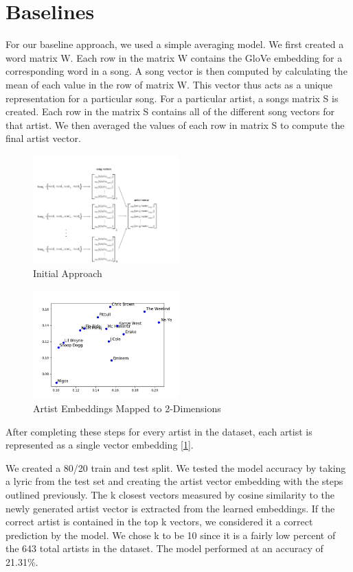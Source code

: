 \documentclass[11pt,a4paper]{article}
\begin{document}
    \section{Baselines}
For our baseline approach, we used a simple averaging model. We first created a word matrix W. Each row in the matrix W contains the GloVe embedding  for a corresponding word in a song. 
A song vector is then computed by calculating the mean of each value in the row of matrix W. 
This vector thus acts as a unique representation for a particular song. 
For a particular artist, a songs matrix S is created. Each row in the matrix S contains all of the different song vectors for that artist. 
We then averaged the values of each row in matrix S to compute the final artist vector. 

\begin{figure}[t]
    \centering
    \includegraphics[width=0.5\textwidth]{figs/naive_model.png}
    \caption{Initial Approach}
    \label{fig:naive}
\end{figure}
\begin{figure}[ht]
    \centering
    \includegraphics[width=0.5\textwidth]{figs/artist_dist.png}
    \caption{Artist Embeddings Mapped to 2-Dimensions}
    \label{fig:artist}
\end{figure}


After completing these steps for every artist in the dataset, each artist is represented as a single vector embedding [\ref{fig:naive}].


We created a 80/20 train and test split. We tested the model accuracy by taking a lyric from the test set and creating the artist vector embedding with the steps outlined previously. The k closest vectors measured by cosine similarity to the newly generated artist vector is extracted from the learned embeddings. If the correct artist is contained in the top k vectors, we considered it a correct prediction by the model. We chose k to be 10 since it is a fairly low percent of the 643 total artists in the dataset. The model performed at an accuracy of 21.31\%. 
\end{document}
